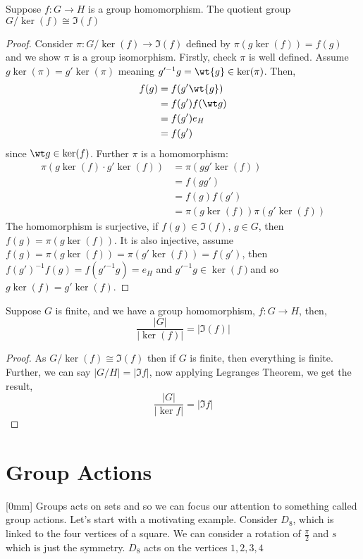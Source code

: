 \begin{nthm}
  Suppose $f : G \to H$ is a group homomorphism. The quotient group $G/\ker(f)\cong \Im(f)$
\end{nthm}
\begin{proof}
  Consider $\pi : G/\ker(f) \to \Im(f)$ defined by $\pi(g\ker(f)) = f(g)$ and we show $\pi$ is a group isomorphism. Firstly, check $\pi$ is well defined. Assume $g\ker(\pi) = g'\ker(\pi)$ meaning $g'^{-1}g = \wt{g} \in \ker(\pi)$. Then,
  \begin{align*}
    f(g) &= f(g'\wt{g})\\
    &= f(g')f(\wt g)\\
    &= f(g')e_H\\
    &= f(g')
  \end{align*}
  since $\wt g \in \ker (f)$. Further $\pi$ is a homomorphism:
  \begin{align*}
    \pi(g\ker(f) \cdot g'\ker(f)) &= \pi(gg'\ker(f))\\
    &= f(gg')\\
    &= f(g)f(g')\\
    &= \pi(g\ker (f))\pi(g'\ker (f))
  \end{align*}
  The homomorphism is surjective, if $f(g) \in \Im(f)$, $g \in G$, then $f(g) = \pi(g\ker (f))$. It is also injective, assume $f(g) = \pi(g\ker(f)) = \pi(g'\ker (f)) = f(g')$, then $f(g')^{-1}f(g) = f(g'^{-1}g) = e_H$  and $g'^{-1}g \in \ker(f)$and so $g\ker(f) = g'\ker(f)$.
\end{proof}

\begin{ncor}
   Suppose $G$ is finite, and we have a group homomorphism, $f: G \to H$, then,
   $$ \frac{|G|}{|\ker (f)|} = |\Im(f)| $$
\end{ncor}
\begin{proof}
  As $G/\ker(f)\cong \Im(f)$ then if $G$ is finite, then everything is finite. Further, we can say $|G/H| = |\Im f|$, now applying Legranges Theorem, we get the result,
  $$ \frac{|G|}{|\ker f|} = |\Im f| $$
\end{proof}

\section{Group Actions}[0mm]
Groups acts on sets and so we can focus our attention to something called group actions. Let's start with a motivating example. Consider $D_8$, which is linked to the four vertices of a square. We can consider a rotation of $\frac{\pi }{2}$ and $s$ which is just the symmetry. $D_8$ acts on the vertices $1, 2, 3, 4$

